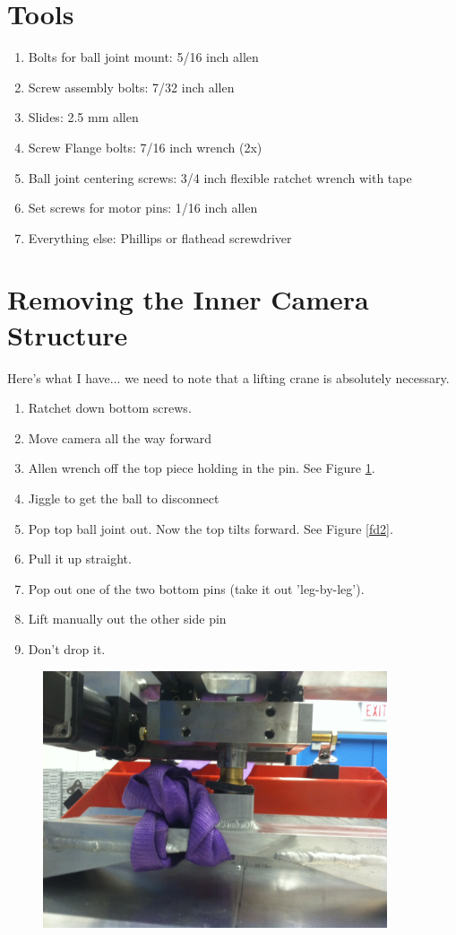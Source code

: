 \documentclass[11pt]{article}
\begin{document}
\section{Tools}
\begin{enumerate}
	\item[]Bolts for ball joint mount: 5/16 inch allen
	\item[]Screw assembly bolts: 7/32 inch allen 
	\item[]Slides: 2.5 mm allen
	\item[]Screw Flange bolts: 7/16 inch wrench (2x)
	\item[]Ball joint centering screws: 3/4 inch flexible ratchet wrench with tape
	\item[]Set screws for motor pins: 1/16 inch allen
	\item[]Everything else: Phillips or flathead screwdriver
\end{enumerate}
\section{Removing the Inner Camera Structure}

Here's what I have... we need to note that a lifting crane is absolutely necessary.
\begin{enumerate}
\item Ratchet down bottom screws.
\item Move camera all the way forward
\item Allen wrench off the top piece holding in the pin.  See Figure \ref{fd1}.
\item Jiggle to get the ball to disconnect
\item Pop top ball joint out.  Now the top tilts forward.  See Figure \ref{fd2}.
\item Pull it up straight.
\item Pop out one of the two bottom pins (take it out 'leg-by-leg'). 
\item Lift manually out the other side pin
\item Don't drop it.  
\end{enumerate}

\begin{figure}[h]
\begin{center}
\includegraphics[width = 4in]{photo_2.png}
\end{center}
\caption{}  
\label{fd1}
\end{figure}
\end{document}
